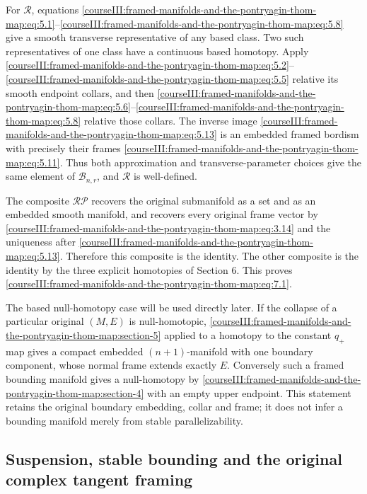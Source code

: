 For \(\mathcal R\), equations \eqref{courseIII:framed-manifolds-and-the-pontryagin-thom-map:eq:5.1}--\eqref{courseIII:framed-manifolds-and-the-pontryagin-thom-map:eq:5.8} give a smooth transverse representative of any based class. Two such representatives of one class have a continuous based homotopy. Apply \eqref{courseIII:framed-manifolds-and-the-pontryagin-thom-map:eq:5.2}--\eqref{courseIII:framed-manifolds-and-the-pontryagin-thom-map:eq:5.5} relative its smooth endpoint collars, and then \eqref{courseIII:framed-manifolds-and-the-pontryagin-thom-map:eq:5.6}--\eqref{courseIII:framed-manifolds-and-the-pontryagin-thom-map:eq:5.8} relative those collars. The inverse image \eqref{courseIII:framed-manifolds-and-the-pontryagin-thom-map:eq:5.13} is an embedded framed bordism with precisely their frames \eqref{courseIII:framed-manifolds-and-the-pontryagin-thom-map:eq:5.11}. Thus both approximation and transverse-parameter choices give the same element of \(\mathcal B_{n,r}\), and \(\mathcal R\) is well-defined.

The composite \(\mathcal R\mathcal P\) recovers the original submanifold as a set and as an embedded smooth manifold, and recovers every original frame vector by \eqref{courseIII:framed-manifolds-and-the-pontryagin-thom-map:eq:3.14} and the uniqueness after \eqref{courseIII:framed-manifolds-and-the-pontryagin-thom-map:eq:5.13}. Therefore this composite is the identity. The other composite is the identity by the three explicit homotopies of Section 6. This proves \eqref{courseIII:framed-manifolds-and-the-pontryagin-thom-map:eq:7.1}.

The based null-homotopy case will be used directly later. If the collapse of a particular original \((M,E)\) is null-homotopic, \cref{courseIII:framed-manifolds-and-the-pontryagin-thom-map:section-5} applied to a homotopy to the constant \(q_+\) map gives a compact embedded \((n+1)\)-manifold with one boundary component, whose normal frame extends exactly \(E\). Conversely such a framed bounding manifold gives a null-homotopy by \cref{courseIII:framed-manifolds-and-the-pontryagin-thom-map:section-4} with an empty upper endpoint. This statement retains the original boundary embedding, collar and frame; it does not infer a bounding manifold merely from stable parallelizability.

\label{courseIII:framed-manifolds-and-the-pontryagin-thom-map:pt-stabilization-and-original-framing}

\subsection{Suspension, stable bounding and the original complex tangent framing}
\label{courseIII:framed-manifolds-and-the-pontryagin-thom-map:section-8}

